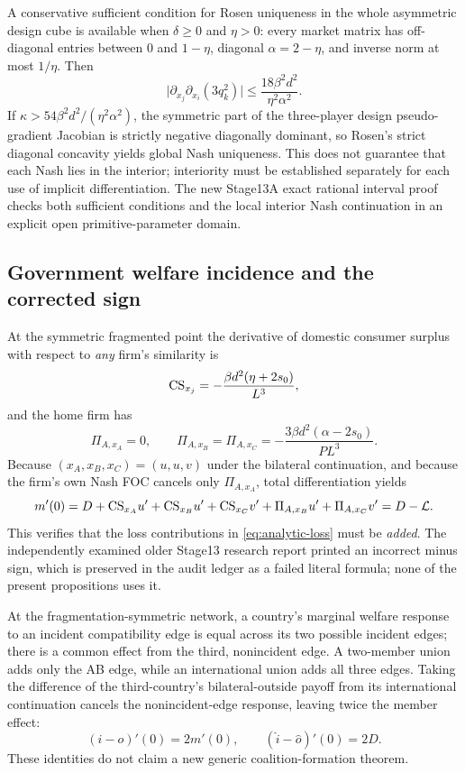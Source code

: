 A conservative sufficient condition for Rosen
uniqueness in the whole asymmetric design cube
is available when $\delta\geq0$ and $\eta>0$:
every market matrix has off-diagonal entries
between $0$ and $1-\eta$, diagonal $\alpha=2-\eta$,
and inverse norm at most $1/\eta$.
Then
\[
 \big|\partial_{x_j}\partial_{x_i}(3q_k^2)\big|
 \leq \frac{18\beta^2d^2}{\eta^2\alpha^2}.
\]
If $\kappa>54\beta^2d^2/(\eta^2\alpha^2)$,
the symmetric part of the three-player design
pseudo-gradient Jacobian is strictly negative
diagonally dominant, so Rosen's strict diagonal
concavity yields global Nash uniqueness.
This does not guarantee that each Nash lies
in the interior; interiority must be established
separately for each use of implicit differentiation.
The new Stage13A exact rational interval proof
checks both sufficient conditions and the
local interior Nash continuation in an explicit
open primitive-parameter domain.

\subsection{Government welfare incidence and the corrected sign}

At the symmetric fragmented point the derivative
of domestic consumer surplus with respect to
\emph{any} firm's similarity is
\[
 \mathrm{CS}_{x_j}
 =-\frac{\beta d^2(\eta+2s_0)}{L^3},
\]
and the home firm has
\[
 \Pi_{A,x_A}=0,\qquad
 \Pi_{A,x_B}=\Pi_{A,x_C}
 =-\frac{3\beta d^2(\alpha-2s_0)}{PL^3}.
\]
Because $(x_A,x_B,x_C)=(u,u,v)$ under
the bilateral continuation, and because the
firm's own Nash FOC cancels only
$\Pi_{A,x_A}$, total differentiation yields
\[
 m'(0)=D+\mathrm{CS}_{x_A}u'
       +\mathrm{CS}_{x_B}u'+\mathrm{CS}_{x_C}v'
       +\Pi_{A,x_B}u'+\Pi_{A,x_C}v'
     =D-\mathcal L.
\]
This verifies that the loss contributions in
\eqref{eq:analytic-loss} must be \emph{added}.
The independently examined older Stage13 research
report printed an incorrect minus sign, which is
preserved in the audit ledger as a failed literal
formula; none of the present propositions uses it.

At the fragmentation-symmetric network, a country's
marginal welfare response to an incident compatibility
edge is equal across its two possible incident edges;
there is a common effect from the third,
nonincident edge. A two-member union adds only the
AB edge, while an international union adds all
three edges. Taking the difference of the
third-country's bilateral-outside payoff from
its international continuation cancels the
nonincident-edge response, leaving twice the
member effect:
\[
 (i-o)'(0)=2m'(0),\qquad
 (\widehat i-\widehat o)'(0)=2D.
\]
These identities do not claim a new generic
coalition-formation theorem.

